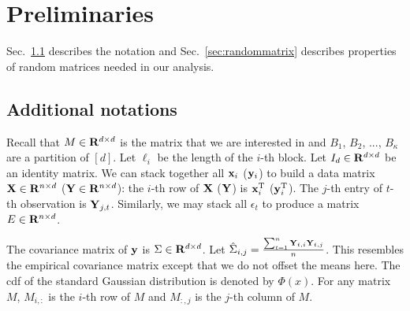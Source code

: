 \section{Preliminaries}\label{sec:prelim}
Sec.~\ref{sec:notations} describes the notation and Sec.~\ref{sec:randommatrix} describes properties of random matrices needed in our analysis. 

\subsection{Additional notations}\label{sec:notations}
 Recall that $M \in \mathbf{R}^{d \times d}$ is the matrix that we are interested in and $B_1$, $B_2$, ..., $B_{\kappa}$ are a partition of $[d]$. Let $\ell_i$ be the length of the $i$-th block. Let $I_d \in \mathbf{R}^{d \times d}$ be an identity matrix. We can stack together all $\mathbf{x}_i$ ($\mathbf{y}_i$) to build a data matrix $\mathbf{X} \in \mathbf{R}^{n \times d}$ ($\mathbf{Y} \in \mathbf{R}^{n \times d}$): the $i$-th row of $\mathbf{X}$ ($\mathbf{Y}$) is $\mathbf{x}^{\mathrm{T}}_i$ ($\mathbf{y}^{\mathrm{T}}_i$). The $j$-th entry of $t$-th observation is $\mathbf{Y}_{j, t}$. Similarly, we may stack all $\epsilon_t$ to produce a matrix $E\in \mathbf{R}^{n \times d}$. 



\iffalse
\mypara{Permutation.} Because we assume that $M$ is sampled from stochastic block models, we may permute the coordinates in the model so that the transition matrix $M^{\Pi}$ after the permutation exhibits block structure:
\begin{equation}\label{eqn:block}
    M^{\Pi} = 
    \left(
    \begin{array}{cccc}
        M_1 & 0 & \dots  & 0 \\
        0  &  M_2  & \dots & 0 \\
         & \dots & \dots   \\
        0 & \dots & \dots & M_k
     \end{array}
    \right), 
\end{equation}
\fi


 The covariance matrix of $\mathbf{y}$ is $\Sigma \in \mathbf{R}^{d\times d}$. Let
$ \hat \Sigma_{i,j} = \frac{\sum_{t = 1}^n \mathbf{Y}_{t, i} \mathbf{Y}_{t, j}}{n}$. This resembles the empirical covariance matrix except that we do not offset the means here. 
The cdf of the standard Gaussian distribution is denoted by $\Phi(x)$. For any matrix $M$, $M_{i, :}$ is the $i$-th row of $M$ and $M_{:, j}$ is the $j$-th column of $M$.



